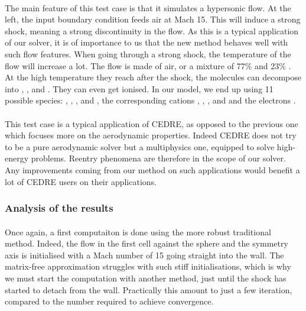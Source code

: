         \paragraph{}

        \paragraph{}
        The main feature of this test case is that it simulates a hypersonic flow.
        At the left, the input boundary condition feeds air at Mach 15.
        This will induce a strong shock, meaning a strong discontinuity in the flow.
        As this is a typical application of our solver, it is of importance to us that the new method behaves well with such flow features.
        When going through a strong shock, the temperature of the flow will increase a lot.
        The flow is made of air, or a mixture of 77\%  and 23\% .
        At the high temperature they reach after the shock, the molecules can decompose into , , and .
        They can even get ionised.
        In our model, we end up using 11 possible species: , , ,  and , the corresponding cations , , ,  and  and the electrons .

        \paragraph{}
        This test case is a typical application of CEDRE, as opposed to the previous one which focuses more on the aerodynamic properties.
        Indeed CEDRE does not try to be a pure aerodynamic solver but a multiphysics one, equipped to solve high-energy problems.
        Reentry phenomena are therefore in the scope of our solver.
        Any improvements coming from our method on such applications would benefit a lot of CEDRE users on their applications.


      \subsubsection{Analysis of the results}

        \paragraph{}
        Once again, a first computaiton is done using the more robust traditional method.
        Indeed, the flow in the first cell against the sphere and the symmetry axis is initialised with a Mach number of 15 going straight into the wall.
        The matrix-free approximation struggles with such stiff initialisations, which is why we must start the computation with another method, just until the shock has started to detach from the wall.
        Practically this amount to just a few iteration, compared to the number required to achieve convergence.

